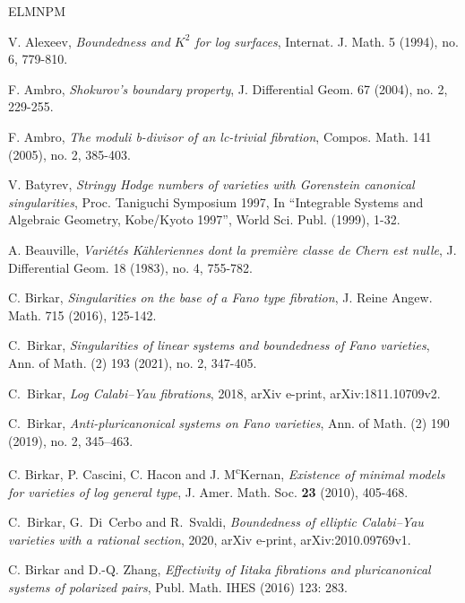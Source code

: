 \documentclass{amsart}[12pt,a4paper]
\theoremstyle{definition}
\begin{document}
\begin{thebibliography}{ELMNPM}

 V. Alexeev, \textit{Boundedness and $K^{2}$ for log surfaces}, Internat. J. Math. 5 (1994), no. 6, 779-810. 

 F. Ambro, \textit{Shokurov's boundary property}, 
J. Differential Geom. 67 (2004), no. 2, 229-255. 

 F. Ambro, \textit{The moduli b-divisor of an lc-trivial fibration},
Compos. Math. 141 (2005), no. 2, 385-403. 

 V.  Batyrev, \textit{Stringy Hodge numbers of varieties with Gorenstein canonical singularities}, Proc. Taniguchi Symposium 1997, In ``Integrable Systems and Algebraic Geometry, Kobe/Kyoto 1997'', World Sci. Publ. (1999), 1-32.

 A. Beauville, \textit{Vari\'et\'es {K}\"ahleriennes dont la premi\`ere classe de {C}hern est nulle}, J. Differential Geom. 18 (1983),
no. 4, 755-782.

 C. Birkar, \textit{Singularities on the base of a Fano type fibration}, 
J. Reine Angew. Math. 715 (2016), 125-142. 

C.~Birkar, \textit{Singularities of linear systems and 
boundedness of Fano varieties},
Ann. of Math. (2) 193 (2021), no. 2, 347-405.

C.~Birkar, \textit{Log Calabi--Yau fibrations}, 2018,
arXiv e-print, arXiv:1811.10709v2. 

C.~Birkar, \textit{Anti-pluricanonical systems on Fano varieties}, Ann. of Math. (2) 190 (2019), no. 2, 345--463.

 C. Birkar, P. Cascini, C. Hacon and J. M\textsuperscript{c}Kernan,
\textit{Existence of minimal models for varieties of log general type},
J. Amer. Math. Soc. \textbf{23} (2010), 405-468.

C.~Birkar, G.~Di~Cerbo and R.~Svaldi,
\textit{Boundedness of elliptic Calabi--Yau varieties with a rational section}, 2020,
arXiv e-print, 
arXiv:2010.09769v1.


C. Birkar and D.-Q. Zhang, 
\textit{Effectivity of Iitaka fibrations and pluricanonical systems of polarized pairs},
Publ. Math. IHES (2016) 123: 283. 



\end{thebibliography}
\end{document}
